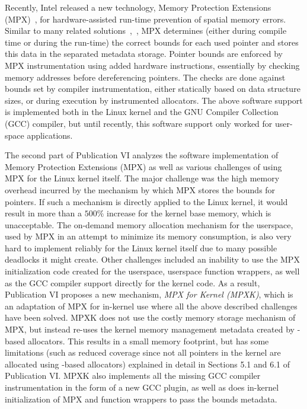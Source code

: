 Recently, Intel released a new technology, \intel Memory Protection Extensions (MPX)~\cite{ramakesavan2015intel}, for hardware-assisted run-time prevention of spatial memory errors.  Similar to many related solutions~\cite{jones1997backwards},~\cite{nagarakatte2009softbound}, MPX determines (either during compile time or during the run-time) the correct bounds for each used pointer and stores this data in the separated metadata storage. Pointer bounds are enforced by MPX instrumentation using added hardware instructions, essentially by checking memory addresses before dereferencing pointers. The checks are done against bounds set by compiler instrumentation, either statically based on data structure sizes, or during execution by instrumented allocators. The above software support is implemented both in the Linux kernel and the GNU Compiler Collection (GCC) compiler, but until recently, this software support only worked for user-space applications. 
 
The second part of Publication VI analyzes the software implementation of \intel Memory Protection Extensions (MPX) as well as various challenges of using MPX for the Linux kernel itself. The major challenge was the high memory overhead incurred by the mechanism by which MPX stores the bounds for pointers. If such a mechanism is directly applied to the Linux kernel, it would result in more than a $500\%$ increase for the kernel base memory, which is unacceptable. The on-demand memory allocation mechanism for the userspace, used by MPX in an attempt to minimize its memory consumption, is also very hard to implement reliably for the Linux kernel itself due to many possible deadlocks it might create. Other challenges included an inability to use the MPX initialization code created for the userspace, userspace function wrappers, as well as the GCC compiler support directly for the kernel code.
As a result, Publication VI proposes a new mechanism, \emph{MPX for Kernel (MPXK)}, which is an adaptation of \intel MPX for in-kernel use where all the above described challenges have been solved. MPXK does not use the costly memory storage mechanism of MPX, but instead re-uses the kernel memory management metadata created by -based allocators. This results in a small memory footprint, but has some limitations (such as reduced coverage since not all pointers in the kernel are allocated using -based allocators) explained in detail in Sections 5.1 and 6.1 of Publication VI. MPXK also implements all the missing GCC compiler instrumentation in the form of a new GCC plugin, as well as does in-kernel initialization of MPX and function wrappers to pass the bounds metadata. 

